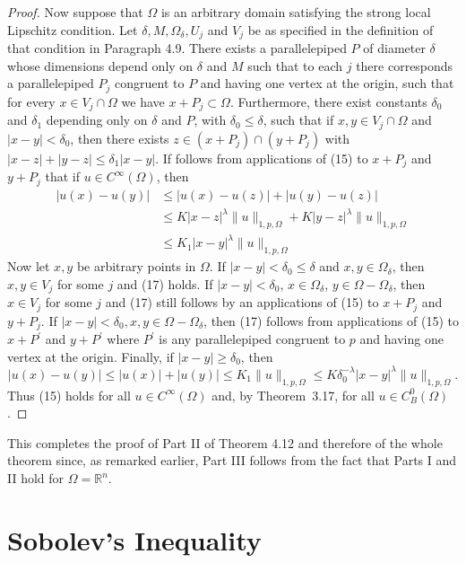 \begin{proof}
  Now suppose that $\Omega$ is an arbitrary domain satisfying the strong local Lipschitz 
  condition. Let $\delta, M, \Omega_\delta, U_j$ and $V_j$ be as specified in the definition of 
  that condition in Paragraph 4.9. There exists a parallelepiped $P$ of diameter $\delta$ whose 
  dimensions depend only on $\delta$ and $M$ such that to each $j$ there corresponds a 
  parallelepiped $P_j$ congruent to $P$ and having one vertex at the origin,
  such that for every $x \in V_j \cap \Omega$ we have $x+P_j \subset \Omega$.
  Furthermore, there exist constants $\delta_0$ and $\delta_1$ depending only on $\delta$
  and $P$, with $\delta_0 \leq \delta$, such that if $x, y \in V_j \cap \Omega$
  and $|x-y|<\delta_0$, then there exists $z \in\left(x+P_j\right) \cap\left(y+P_j\right)$
  with $|x-z|+|y-z| \leq \delta_1|x-y|$. If follows from applications of (15) to $x+P_j$
  and $y+P_j$ that if $u \in C^{\infty}(\Omega)$, then
  \[
  \begin{aligned}
  |u(x)-u(y)| & \leq|u(x)-u(z)|+|u(y)-u(z)| \\
  & \leq K|x-z|^\lambda\|u\|_{1, p, \Omega}+K|y-z|^\lambda\|u\|_{1, p, \Omega} \\
  & \leq K_1|x-y|^\lambda\|u\|_{1, p, \Omega}
  \end{aligned}
  \]
  Now let $x, y$ be arbitrary points in $\Omega$. If $|x-y|<\delta_0 \leq \delta$
  and $x, y \in \Omega_\delta$, then $x, y \in V_j$ for some $j$ and (17) holds.
  If $|x-y|<\delta_0$, $x \in \Omega_\delta$, $y \in \Omega-\Omega_\delta$,
  then $x \in V_j$ for some $j$ and (17) still follows by an applications of (15)
  to $x+P_j$ and $y+P_j$. If $|x-y|<\delta_0, x, y \in \Omega-\Omega_\delta$,
  then (17) follows from applications of (15) to $x+P^{\prime}$ and $y+P^{\prime}$
  where $P^{\prime}$ is any parallelepiped congruent to $p$ and having one vertex at the origin. 
  Finally, if $|x-y| \geq \delta_0$, then
  \[
  |u(x)-u(y)| \leq|u(x)|+|u(y)| \leq K_1\|u\|_{1, p, \Omega} \leq K \delta_0^{-\lambda}|x-y|^\lambda\|u\|_{1, p, \Omega} .
  \]
  Thus (15) holds for all $u \in C^{\infty}(\Omega)$ and, by Theorem~3.17,
  for all $u \in C_B^0(\Omega)$.
\end{proof}

This completes the proof of Part II of Theorem 4.12 and therefore of the whole theorem since,
as remarked earlier, Part III follows from the fact that Parts I and II hold
for $\Omega=\mathbb{R}^n$.


\section{Sobolev's Inequality}


